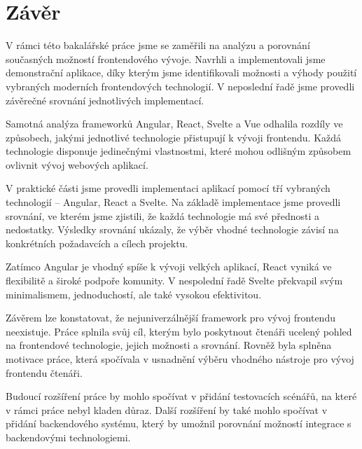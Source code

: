 \section*{Závěr}

\begin{zvyraznenyodstavec}
V rámci této bakalářské práce jsme se zaměřili na analýzu a porovnání současných možností frontendového vývoje. 
Navrhli a implementovali jsme demonstrační aplikace, díky kterým jsme identifikovali možnosti a výhody použití vybraných moderních frontendových technologií. 
V neposlední řadě jsme provedli závěrečné srovnání jednotlivých implementací.

Samotná analýza frameworků Angular, React, Svelte a Vue odhalila rozdíly ve způsobech, jakými jednotlivé technologie přistupují k vývoji frontendu. 
Každá technologie disponuje jedinečnými vlastnostmi, které mohou odlišným způsobem ovlivnit vývoj webových aplikací. 

V praktické části jsme provedli implementaci aplikací pomocí tří vybraných technologií -- Angular, React a Svelte. 
Na základě implementace jsme provedli srovnání, ve kterém jsme zjistili, že každá technologie má své přednosti a nedostatky. 
Výsledky srovnání ukázaly, že výběr vhodné technologie závisí na konkrétních požadavcích a cílech projektu.

Zatímco Angular je vhodný spíše k vývoji velkých aplikací, React vyniká ve flexibilitě a široké podpoře komunity. 
V nespolední řadě Svelte překvapil svým minimalismem, jednoduchostí, ale také vysokou efektivitou.

Závěrem lze konstatovat, že nejuniverzálnější framework pro vývoj frontendu neexistuje. 
Práce splnila svůj cíl, kterým bylo poskytnout čtenáři ucelený pohled na frontendové technologie, jejich možnosti a srovnání.
Rovněž byla splněna motivace práce, která spočívala v usnadnění výběru vhodného nástroje pro vývoj frontendu čtenáři.

Budoucí rozšíření práce by mohlo spočívat v přidání testovacích scénářů, na které v rámci práce nebyl kladen důraz. 
Další rozšíření by také mohlo spočívat v přidání backendového systému, který by umožnil porovnání možností integrace s backendovými technologiemi.
\end{zvyraznenyodstavec}

